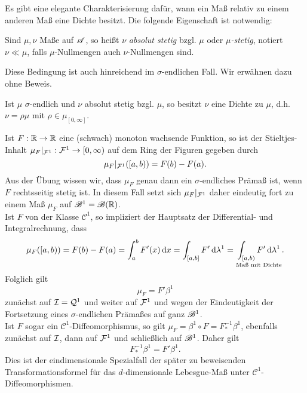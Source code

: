 Es gibt eine elegante Charakterisierung dafür, wann ein Maß relativ zu einem anderen Maß eine Dichte besitzt. Die folgende Eigenschaft ist notwendig:
\begin{definition}
\begin{mdframed}
Sind $\mu,\nu$ Maße auf $\AA$, so heißt $\nu$ \emph{absolut stetig} bzgl. $\mu$ oder \emph{$\mu$-stetig}, notiert $\nu \ll \mu$, falls $\mu$-Nullmengen auch $\nu$-Nullmengen sind.
\end{mdframed}
\end{definition}
Diese Bedingung ist auch hinreichend im $\sigma$-endlichen Fall. Wir erwähnen dazu ohne Beweis.
\begin{satz}
\begin{mdframed}
Ist $\mu$ $\sigma$-endlich und $\nu$ absolut stetig bzgl. $\mu$, so besitzt $\nu$ eine Dichte zu $\mu$, d.h. $\nu=\rho\mu$ mit $\rho \in \mu_{[0,\infty]}$.
\end{mdframed}
\end{satz}

\begin{example}
Ist $F:\R\to \R$ eine (schwach) monoton wachsende Funktion, so ist der Stieltjes-Inhalt $\mu_F|_{\FF^1}:\FF^1\to [0,\infty)$ auf dem Ring der Figuren gegeben durch
$$\mu_F|_{\FF^1}([a,b))=F(b)-F(a).$$
Aus der Übung wissen wir, dass $\mu_F$ genau dann ein $\sigma$-endliches Prämaß ist, wenn $F$ rechtsseitig stetig ist. In diesem Fall setzt sich $\mu_F|_{\FF^1}$ daher eindeutig fort zu einem Maß $\mu_F$ auf $\BB^1=\BB(\R)$. \vspace{0.3pc}\\
Ist $F$ von der Klasse $\mathcal{C}^1$, so impliziert der Hauptsatz der Differential- und Integralrechnung, dass
$$
\mu_F([a,b)) = F(b)-F(a)=\int_a^bF'(x)\D x = \int_{[a,b]}F'\D \lambda^1 = \underset{\te{Maß mit Dichte}}{\int_{[a,b)}F'\D \lambda^1}.
$$
Folglich gilt
$$\mu_F=F'\beta^1$$
zunächst auf $\II=\QQ^1$ und weiter auf $\FF^1$ und wegen der Eindeutigkeit der Fortsetzung eines $\sigma$-endlichen Prämaßes auf ganz $\BB^1$. \vspace{0.3pc}\\
Ist $F$ sogar ein $\mathcal{C}^1$-Diffeomorphismus, so gilt $\mu_F=\beta^1 \circ F=F^{-1}_*\beta^1$, ebenfalls zunächst auf $\II$, dann auf $\FF^1$ und schließlich auf $\BB^1$. Daher gilt
$$F_*^{-1}\beta^1 = F'\beta^1.$$
Dies ist der eindimensionale Spezialfall der später zu beweisenden Transformationsformel für das $d$-dimensionale Lebesgue-Maß unter $\mathcal{C}^1$-Diffeomorphismen.
\end{example}

